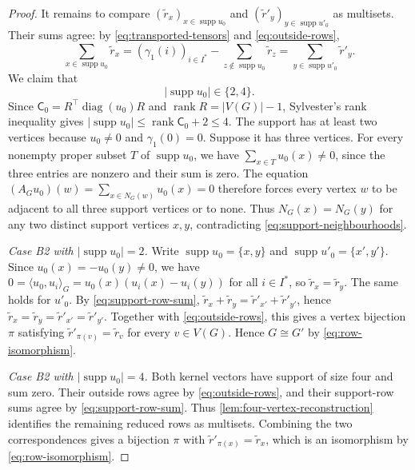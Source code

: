 \documentclass[11pt,a4paper]{article}
\theoremstyle{plain}
\theoremstyle{definition}
\DeclareMathOperator{\supp}{supp}
\DeclareMathOperator{\rank}{rank}
\DeclareMathOperator{\diag}{diag}
\begin{document}
\begin{proof}
  It remains to compare $(\tilde{r}_x)_{x\in\supp u_0}$ and
  $(\tilde{r}'_y)_{y\in\supp u'_0}$ as multisets.
  Their sums agree: by
  \cref{eq:transported-tensors} and \cref{eq:outside-rows},
  \begin{equation}\label{eq:support-row-sum}
    \sum_{x\in\supp u_0}\tilde{r}_x
    = (\gamma_1(i))_{i\in I^*}-\sum_{z\notin\supp u_0}\tilde{r}_z
    = \sum_{y\in\supp u'_0}\tilde{r}'_y.
  \end{equation}
  We claim that
  \begin{equation}\label{eq:kernel-support-sizes}
    |\supp u_0|\in\{2,4\}.
  \end{equation}
  Since $\mathsf{C}_0 = R^{\top} \diag(u_0) R$ and
  $\rank R=|V(G)|-1$, Sylvester's rank inequality gives
  $|\supp u_0| \leq \rank \mathsf{C}_0 + 2 \leq 4$.
  The support has at least two vertices because $u_0\ne0$ and
  $\gamma_1(0)=0$.
  Suppose it has three vertices. For every nonempty proper subset
  $T$ of $\supp u_0$, we have $\sum_{x\in T}u_0(x)\ne0$, since
  the three entries are nonzero and their sum is zero.
  The equation $(A_Gu_0)(w)=\sum_{x\in N_G(w)}u_0(x)=0$ therefore
  forces every vertex $w$ to be adjacent to all three support
  vertices or to none. Thus $N_G(x)=N_G(y)$ for any two distinct
  support vertices $x,y$, contradicting \cref{eq:support-neighbourhoods}.

  \emph{Case B2 with $|\supp u_0|=2$.} Write
  $\supp u_0=\{x,y\}$ and $\supp u'_0=\{x',y'\}$.
  Since $u_0(x)=-u_0(y)\ne0$, we have
  $0=\langle u_0,u_i\rangle_G=u_0(x)(u_i(x)-u_i(y))$ for all $i\in I^*$,
  so $\tilde{r}_x=\tilde{r}_y$. The same holds for $u'_0$.
  By \cref{eq:support-row-sum},
  $\tilde{r}_x+\tilde{r}_y=\tilde{r}'_{x'}+\tilde{r}'_{y'}$, hence
  $\tilde{r}_x=\tilde{r}_y=\tilde{r}'_{x'}=\tilde{r}'_{y'}$.
  Together with \cref{eq:outside-rows}, this gives a vertex bijection
  $\pi$ satisfying $\tilde{r}'_{\pi(v)}=\tilde{r}_v$ for every $v\in V(G)$.
  Hence $G\cong G'$ by \cref{eq:row-isomorphism}.

  \emph{Case B2 with $|\supp u_0|=4$.}
  Both kernel vectors have support of size four and sum zero.
  Their outside rows agree by \cref{eq:outside-rows}, and their
  support-row sums agree by \cref{eq:support-row-sum}.
  Thus \cref{lem:four-vertex-reconstruction} identifies the remaining
  reduced rows as multisets.
  Combining the two correspondences gives a bijection $\pi$ with
  $\tilde{r}'_{\pi(x)}=\tilde{r}_x$, which is an isomorphism by \cref{eq:row-isomorphism}.
\end{proof}
\end{document}
